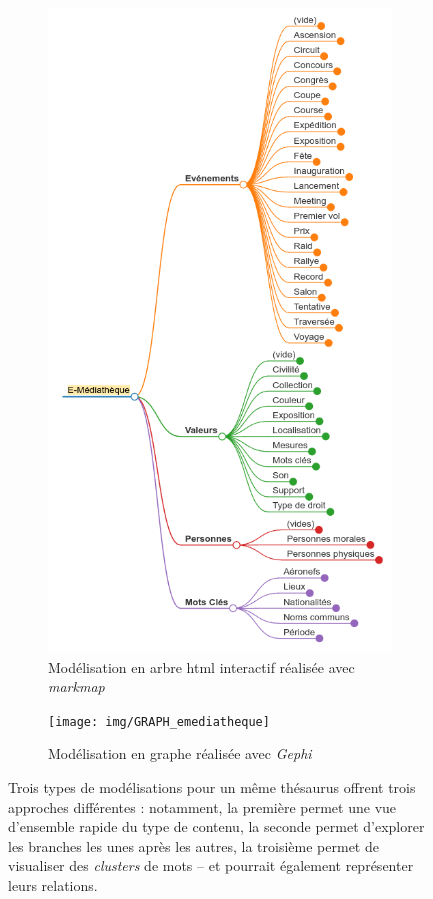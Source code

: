 \begin{figure}[htbp]
\begin{subfigure}{0.45\textwidth}
		\includegraphics[width=\linewidth]{img/MODEL_emediatheque_arbre}
		\caption{Modélisation en arbre html interactif réalisée avec \textit{markmap}}
		\label{model:arbre-emediatheque}
	\end{subfigure}
	\hfill
	\begin{subfigure}{0.5\textwidth}
		\centering
		\texttt{[image: img/GRAPH\_emediatheque]}
		\caption{Modélisation en graphe réalisée avec \textit{Gephi}}
		\label{model:graph-emediatheque}
	\end{subfigure}
	\caption[Modélisation des \gls{thesaurus} du \mae]{Trois types de modélisations pour un même thésaurus offrent trois approches différentes : notamment, la première permet une vue d'ensemble rapide du type de contenu, la seconde permet d'explorer les branches les unes après les autres, la troisième permet de visualiser des \textit{clusters} de mots -- et pourrait également représenter leurs relations.}
	\label{fig:modelisationthesaurus}
\end{figure}


